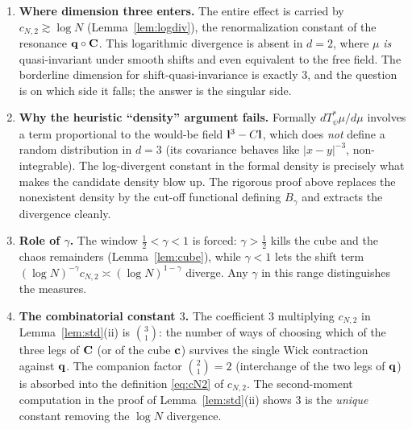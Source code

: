 \begin{enumerate}\setlength\itemsep{4pt}
\item \textbf{Where dimension three enters.} The entire effect is carried by
$c_{N,2}\gtrsim\log N$ (Lemma~\ref{lem:logdiv}), the renormalization constant of
the resonance $\mathbf{q}\circ\mathbf{C}$. This logarithmic
divergence is absent in $d=2$, where $\mu$ \emph{is} quasi-invariant under smooth
shifts and even equivalent to the free field. The borderline dimension for
shift-quasi-invariance is exactly $3$, and the question is on which side it falls;
the answer is the singular side.

\item \textbf{Why the heuristic ``density'' argument fails.} Formally
$dT_\psi^*\mu/d\mu$ involves a term proportional to the would-be field
$\mathbf{l}^3-C\mathbf{l}$, which does \emph{not} define a random distribution in $d=3$ (its
covariance behaves like $|x-y|^{-3}$, non-integrable). The log-divergent constant
in the formal density is precisely what makes the candidate density blow up. The
rigorous proof above replaces the nonexistent density by the cut-off functional
defining $B_\gamma$ and extracts the divergence cleanly.

\item \textbf{Role of $\gamma$.} The window $\tfrac12<\gamma<1$ is forced:
$\gamma>\tfrac12$ kills the cube and the chaos remainders (Lemma~\ref{lem:cube}),
while $\gamma<1$ lets the shift term $(\log N)^{-\gamma}c_{N,2}\asymp(\log
N)^{1-\gamma}$ diverge. Any $\gamma$ in this range distinguishes the measures.

\item \textbf{The combinatorial constant $3$.} The coefficient $3$ multiplying
$c_{N,2}$ in Lemma~\ref{lem:std}(ii) is $\binom{3}{1}$: the number of ways of
choosing which of the three legs of $\mathbf{C}$ (or of the cube $\mathbf{c}$) survives the
single Wick contraction against $\mathbf{q}$. The companion factor
$\binom{2}{1}=2$ (interchange of the two legs of $\mathbf{q}$) is absorbed into the
definition \eqref{eq:cN2} of $c_{N,2}$. The second-moment computation in the proof
of Lemma~\ref{lem:std}(ii) shows $3$ is the \emph{unique} constant removing the
$\log N$ divergence.
\end{enumerate}


